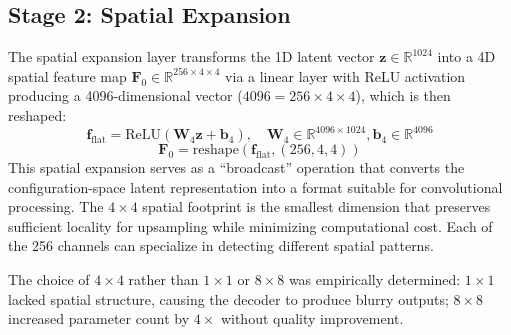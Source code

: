 \documentclass[12pt,a4paper,oneside]{report}
\begin{document}
\subsection{Stage 2: Spatial Expansion}
The spatial expansion layer transforms the 1D latent vector $\mathbf{z} \in \mathbb{R}^{1024}$ into a 4D spatial feature map $\mathbf{F}_0 \in \mathbb{R}^{256 \times 4 \times 4}$ via a linear layer with ReLU activation producing a 4096-dimensional vector ($4096 = 256 \times 4 \times 4$), which is then reshaped:
\begin{equation}
\mathbf{f}_{\text{flat}} = \text{ReLU}(\mathbf{W}_4 \mathbf{z} + \mathbf{b}_4), \quad \mathbf{W}_4 \in \mathbb{R}^{4096 \times 1024}, \mathbf{b}_4 \in \mathbb{R}^{4096}
\end{equation}
\begin{equation}
\mathbf{F}_0 = \text{reshape}(\mathbf{f}_{\text{flat}}, (256, 4, 4))
\end{equation}
This spatial expansion serves as a ``broadcast'' operation that converts the configuration-space latent representation into a format suitable for convolutional processing. The $4 \times 4$ spatial footprint is the smallest dimension that preserves sufficient locality for upsampling while minimizing computational cost. Each of the 256 channels can specialize in detecting different spatial patterns.

The choice of $4 \times 4$ rather than $1 \times 1$ or $8 \times 8$ was empirically determined: $1 \times 1$ lacked spatial structure, causing the decoder to produce blurry outputs; $8 \times 8$ increased parameter count by $4\times$ without quality improvement.
\end{document}

